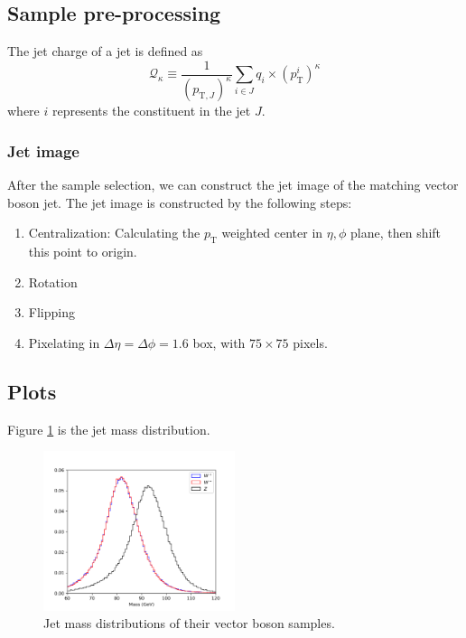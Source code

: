 \documentclass[12pt]{article}
\begin{document}
	\subsection{Sample pre-processing}%
	\label{sub:sample_pre_processing}
		The jet charge of a jet is defined as
		\begin{equation}
			\mathcal{Q}_\kappa \equiv \frac{1}{(p_{\text{T}, J})^{\kappa}} \sum_{i\in J} q_i \times \left( p_{\text{T}}^{i} \right)^{\kappa}
		\end{equation}
		where $i$ represents the constituent in the jet $J$.

		\subsubsection{Jet image}%
		\label{subs:jet_image}
			After the sample selection, we can construct the jet image of the matching vector boson jet. The jet image is constructed by the following steps:
			\begin{enumerate}
				\item Centralization: Calculating the $p_\text{T}$ weighted center in $\eta,\phi$ plane, then shift this point to origin.
				\item Rotation
				\item Flipping
				\item Pixelating in $\Delta\eta = \Delta\phi = 1.6$ box, with $75\times 75$ pixels.
			\end{enumerate}
	\subsection{Plots}%
	\label{sub:plots}
		Figure \ref{fig:jet_mass_distribution} is the jet mass distribution.
		\begin{figure}[htpb]
			\centering
			\includegraphics[width=0.5\textwidth]{jet_mass_distribution.png}
			\caption{Jet mass distributions of their vector boson samples.}
			\label{fig:jet_mass_distribution}
		\end{figure}
\end{document}
